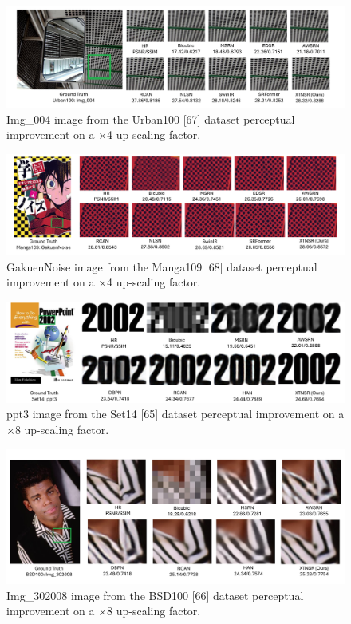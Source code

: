 \documentclass[twocolumn]{svjour3}          %
\begin{document}
\begin{figure}
  \centering
  \includegraphics[width=\linewidth]{14FIGURE.pdf}
   \caption {Img\_004 image from the Urban100 [67] dataset perceptual improvement on a ×4 up-scaling factor.}
    \label{fig:14}
\end{figure}

\begin{figure}
  \centering
  \includegraphics[width=\linewidth]{15FIGURE.pdf}
   \caption {GakuenNoise image from the Manga109 [68] dataset perceptual improvement on a ×4 up-scaling factor.}
    \label{fig:15}
\end{figure}

\begin{figure}
  \centering
  \includegraphics[width=\linewidth]{16FIGURE.pdf}
   \caption {ppt3 image from the Set14 [65] dataset perceptual improvement on a ×8  up-scaling factor.}
    \label{fig:16}
\end{figure}

\begin{figure}
  \centering
  \includegraphics[width=\linewidth]{17FIGURE.pdf}
   \caption {Img\_302008 image from the BSD100 [66] dataset perceptual improvement on a ×8 up-scaling factor.}
    \label{fig:17}
\end{figure}
\end{document}
